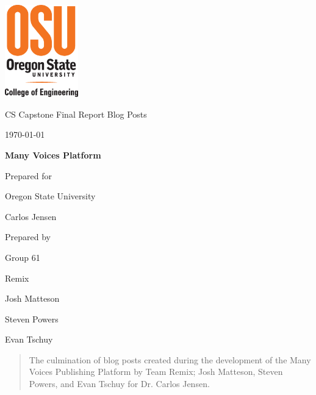 \documentclass[onecolumn, draftclsnofoot,10pt, compsoc]{IEEEtran}
\def \CapstoneTeamName{		Remix}
\def \CapstoneTeamNumber{		61}
\def \GroupMemberOne{			Josh Matteson}
\def \GroupMemberTwo{			Steven Powers}
\def \GroupMemberThree{			Evan Tschuy}
\def \CapstoneProjectName{		Many Voices Platform}
\def \CapstoneSponsorCompany{	Oregon State University}
\def \CapstoneSponsorPerson{		Carlos Jensen}
\def \DocType{
	Final Report Blog Posts
}
\newcommand{\NameSigPair}[1]{\par
	\makebox[2.75in][r]{#1} \hfil 	\makebox[3.25in]{\makebox[2.25in]{\hrulefill} \hfill		\makebox[.75in]{\hrulefill}}
	\par\vspace{-12pt} \textit{\tiny\noindent
		\makebox[2.75in]{} \hfil		\makebox[3.25in]{\makebox[2.25in][r]{Signature} \hfill	\makebox[.75in][r]{Date}}}}
\renewcommand{\NameSigPair}[1]{#1}
\begin{document}
	
\begin{titlepage}
	\begin{singlespace}
		\includegraphics[height=4cm]{../../coe_v_spot1}
		\hfill
		\par\vspace{.2in}
		\centering
		\scshape{
			\huge CS Capstone \DocType \par
			{\large\today}\par
			\vspace{.5in}
			\textbf{\Huge\CapstoneProjectName}\par
			\vfill
			{\large Prepared for}\par
			\Huge \CapstoneSponsorCompany\par
			\vspace{5pt}
			{\Large\NameSigPair{\CapstoneSponsorPerson}\par}
			{\large Prepared by }\par
			Group\CapstoneTeamNumber\par
			\CapstoneTeamName\par
			\vspace{5pt}
			{\Large
				\NameSigPair{\GroupMemberOne}\par
				\NameSigPair{\GroupMemberTwo}\par
				\NameSigPair{\GroupMemberThree}\par
			}
			\vspace{20pt}
		}
		\begin{abstract}
			\noindent The culmination of blog posts created during the development of the Many
			Voices Publishing Platform by Team Remix; Josh Matteson, Steven Powers, and Evan Tschuy 
			for Dr. Carlos Jensen. 
		\end{abstract}
	\end{singlespace}
\end{titlepage}
\tableofcontents
\end{document}
